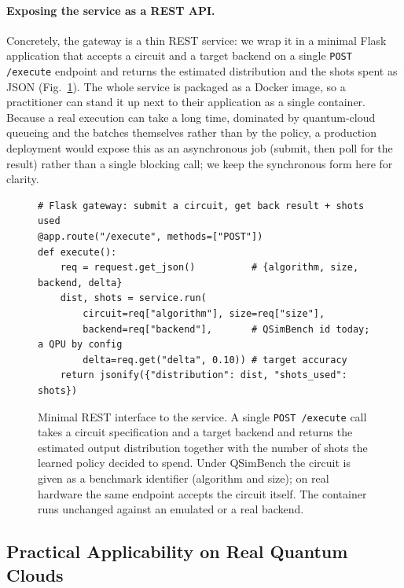 \documentclass[runningheads]{llncs}
\begin{document}
\paragraph{Exposing the service as a REST API.} Concretely, the gateway is a thin
REST service: we wrap it in a minimal Flask application that accepts a circuit and
a target backend on a single \texttt{POST /execute} endpoint and returns the
estimated distribution and the shots spent as JSON (Fig.~\ref{fig:api}). The whole
service is packaged as a Docker image, so a practitioner can stand it up next to
their application as a single container. Because a real execution can take a long
time, dominated by quantum-cloud queueing and the batches themselves rather than
by the policy, a production deployment would expose this as an asynchronous job
(submit, then poll for the result) rather than a single blocking call; we keep the
synchronous form here for clarity.

\begin{figure}[t]
\centering
\begin{minipage}{0.92\textwidth}
\footnotesize
\begin{verbatim}
# Flask gateway: submit a circuit, get back result + shots used
@app.route("/execute", methods=["POST"])
def execute():
    req = request.get_json()          # {algorithm, size, backend, delta}
    dist, shots = service.run(
        circuit=req["algorithm"], size=req["size"],
        backend=req["backend"],       # QSimBench id today; a QPU by config
        delta=req.get("delta", 0.10)) # target accuracy
    return jsonify({"distribution": dist, "shots_used": shots})
\end{verbatim}
\end{minipage}
\caption{Minimal REST interface to the service. A single \texttt{POST /execute}
call takes a circuit specification and a target backend and returns the estimated
output distribution together with the number of shots the learned policy decided
to spend. Under QSimBench the circuit is given as a benchmark identifier
(algorithm and size); on real hardware the same endpoint accepts the circuit
itself. The container runs unchanged against an emulated or a real backend.}
\label{fig:api}
\end{figure}

\subsection{Practical Applicability on Real Quantum Clouds}
\label{sec:applicability}
\end{document}
